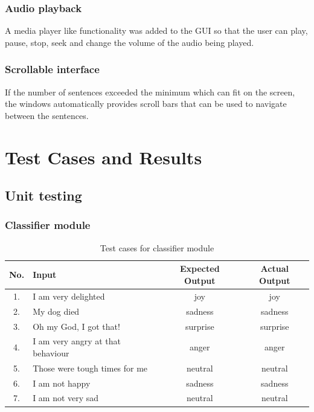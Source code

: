 \documentclass[oneside,a4paper,12pt]{book}
\begin{document}
\subsubsection{Audio playback}
A media player like functionality was added to the GUI so that the user can play, pause, stop, seek and change the volume of the audio being played. 
\subsubsection{Scrollable interface}
If the number of sentences exceeded the minimum which can fit on the screen, the windows automatically provides scroll bars that can be used to navigate between the sentences.

\section{Test Cases and Results}
\subsection{Unit testing}
\subsubsection{Classifier module}   
\begin{table}[!htbp]
	\def\arraystretch{1.5}
	\begin{tabularx}{\textwidth}{|c|X|c|c|}
		\hline 
		No. & Input	& Expected Output & Actual Output \\ \hline
		1. & I am very delighted & joy & joy \\ \hline
		2. & My dog died & sadness & sadness \\ \hline
		3. & Oh my God, I got that! & surprise & surprise \\ \hline
		4. & I am very angry at that behaviour & anger & anger \\ \hline
		5. & Those were tough times for me & neutral & neutral \\ \hline
		6. & I am not happy & sadness & sadness \\ \hline
		7. & I am not very sad & neutral & neutral \\ \hline
	\end{tabularx}
	\caption{Test cases for classifier module}
	\label{tab:testcases}
\end{table}

\newpage
\end{document}
